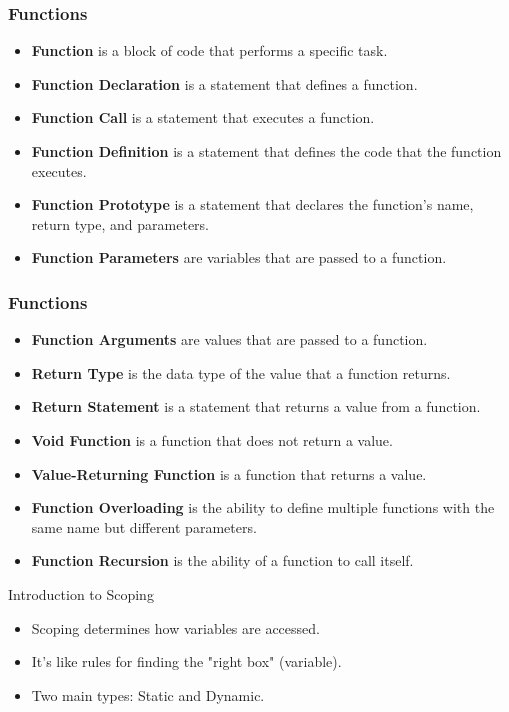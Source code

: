 \begin{frame}
    \frametitle{Functions}
\begin{itemize}
    \item \textbf{Function} is a block of code that performs a specific task.
    \item \textbf{Function Declaration} is a statement that defines a function.
    \item \textbf{Function Call} is a statement that executes a function.
    \item \textbf{Function Definition} is a statement that defines the code that the function executes.
    \item \textbf{Function Prototype} is a statement that declares the function's name, return type, and parameters.
    \item \textbf{Function Parameters} are variables that are passed to a function.
\end{itemize}
\end{frame}
    
\begin{frame}
    \frametitle{Functions}
    \begin{itemize}
    \item \textbf{Function Arguments} are values that are passed to a function.
    \item \textbf{Return Type} is the data type of the value that a function returns.
    \item \textbf{Return Statement} is a statement that returns a value from a function.
    \item \textbf{Void Function} is a function that does not return a value.
    \item \textbf{Value-Returning Function} is a function that returns a value.
    \item \textbf{Function Overloading} is the ability to define multiple functions with the same name but different parameters.
    \item \textbf{Function Recursion} is the ability of a function to call itself.
    \end{itemize}
\end{frame}

%     


\begin{frame}{Introduction to Scoping}
    \begin{itemize}
      \item Scoping determines how variables are accessed.
      \item It's like rules for finding the "right box" (variable).
      \item Two main types: Static and Dynamic.
    \end{itemize}
  \end{frame}
  
